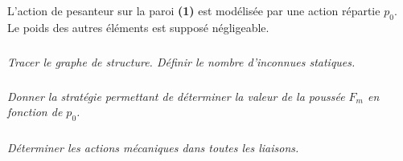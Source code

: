 \documentclass[10pt,fleqn]{article} %
\begin{document}
\begin{multicols}{2}
L'action de pesanteur sur la paroi \textbf{(1)} est modélisée par une action répartie $p_0$. Le poids des autres éléments est supposé négligeable.

\subparagraph{}\textit{Tracer le graphe de structure. Définir le nombre d'inconnues statiques.}

\subparagraph{}\textit{Donner la stratégie permettant de déterminer la valeur de la poussée $F_m$ en fonction de $p_0$.}

\subparagraph{}\textit{Déterminer les actions mécaniques dans toutes les liaisons.}

\ifprof
\else
\end{multicols}
\fi

\end{document}
